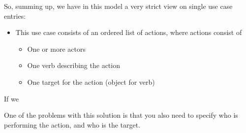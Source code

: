 So, summing up, we have in this model a very strict view on single use case entries:
\begin{itemize}
  \item This use case consists of an ordered list of actions, where actions consist of
  \begin{itemize}
	\item One or more actors
	\item One verb describing the action
	\item One target for the action (object for verb)
  \end{itemize}
\end{itemize}
If we 


One of the problems with this solution is that you also need to specify who is performing the action, and who is the target.
